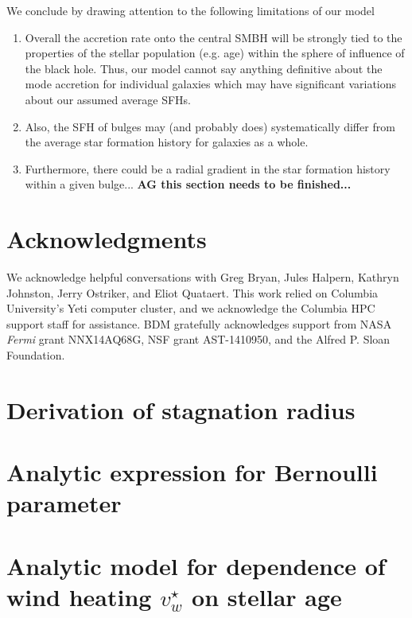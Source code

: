 \documentclass[usenatbib,fleqn]{mn2e}
\newcommand{\vwO}{v_{w}}
\begin{document}
We conclude by drawing attention to the following limitations of our model
    \begin{enumerate}
    \item Overall the accretion rate onto the central SMBH will be strongly
    tied to the properties of the stellar population (e.g. age) within
    the sphere of influence of the black hole. Thus, our model cannot
    say anything definitive about the mode accretion for individual
    galaxies which may have significant variations about our assumed
    average SFHs.
    \item Also, the SFH of bulges may (and probably
      does) systematically differ from the average star formation
      history for galaxies as a whole.
    \item Furthermore, there could be a radial gradient in the star
      formation history within a given bulge... 
     {\bf AG this section needs to be finished...}
    \end{enumerate}
  

\section*{Acknowledgments}

We acknowledge helpful conversations with Greg Bryan, Jules Halpern,
Kathryn Johnston, Jerry Ostriker, and Eliot Quataert.  This work
relied on Columbia University's Yeti computer cluster, and we
acknowledge the Columbia HPC support staff for assistance.  BDM
gratefully acknowledges support from NASA {\it Fermi} grant
NNX14AQ68G, NSF grant AST-1410950, and the Alfred P. Sloan Foundation.


  \clearpage
  \appendix
  \section{Derivation of stagnation radius}
  \label{app:rs}
  

  \section{Analytic expression for Bernoulli parameter}
  \label{app:be}
  

  \section{Analytic model for dependence of wind heating $\vwO^{\star}$ on stellar age}
\label{app:windheat}


  \footnotesize{
    
    
  }
\end{document}
